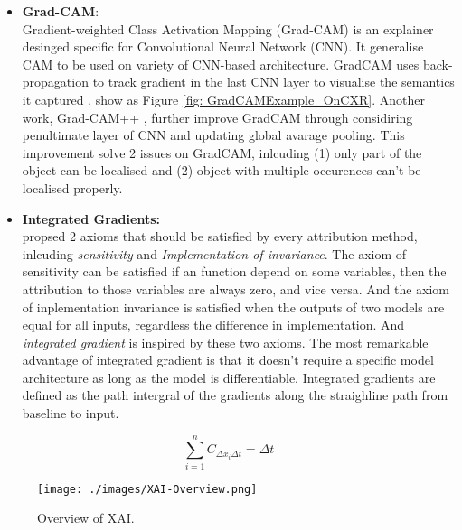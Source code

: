 \begin{itemize}
    \item \textbf{Grad-CAM}: \\ Gradient-weighted Class Activation Mapping (Grad-CAM) is an explainer desinged specific for Convolutional Neural Network (CNN). It generalise CAM \citep{Zhou2015CAM} to be used on variety of CNN-based architecture. GradCAM uses back-propagation to track gradient in the last CNN layer to visualise the semantics it captured \citep{Selvaraju2017GradCAM}, show as Figure \ref{fig: GradCAMExample_OnCXR}. Another work, Grad-CAM++ \citep{Chattopadhay2018GradCAM++}, further improve GradCAM through considiring penultimate layer of CNN and updating global avarage pooling. This improvement solve 2 issues on GradCAM, inlcuding (1) only part of the object can be localised and (2) object with multiple occurences can't be localised properly.
    \item \textbf{Integrated Gradients:} \\ \citet{Sundararajan2017IntegratedGradient} propsed 2 axioms that should be satisfied by every attribution method, inlcuding \textit{sensitivity} and \textit{Implementation of invariance}. The axiom of sensitivity can be satisfied if an function depend on some variables, then the attribution to those variables are always zero, and vice versa. And the axiom of inplementation invariance is satisfied when the outputs of two models are equal for all inputs, regardless the difference in implementation. And \textit{integrated gradient} is inspired by these two axioms. The most remarkable advantage of integrated gradient is that it doesn't require a specific model architecture as long as the model is differentiable. Integrated gradients are defined as the path intergral of the gradients along the straighline path from baseline to input.

\end{itemize}

\begin{equation} \label{eq: summation-to-delta}
    \sum_{i=1}^{n} C_{\Delta x_{i} \Delta t} = \Delta t
\end{equation}

\begin{figure}[!h]
    \centering
    \texttt{[image: ./images/XAI-Overview.png]}
    \caption{Overview of XAI. \citet{Belle2020XAIPriciples}}
    \label{fig: XAI_Overview}
\end{figure}

